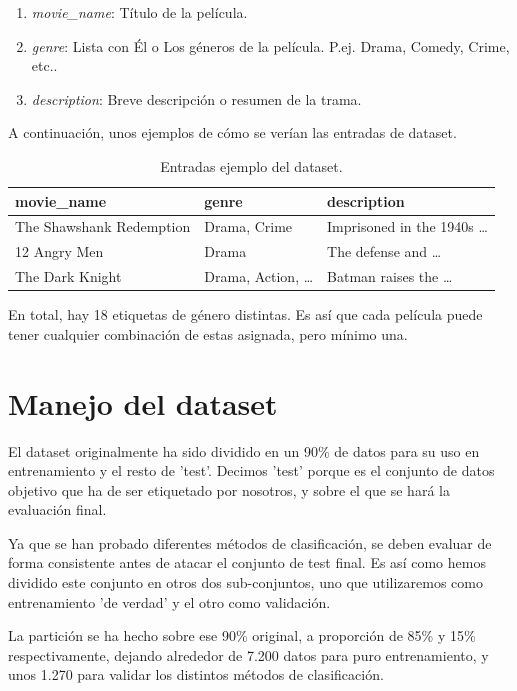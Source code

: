 \documentclass[11pt,spanish,listoffigures,listoftables]{tfgetsinf}
\begin{document}
\begin{enumerate}
    \item \textit{movie\_name}: Título de la película.
    \item \textit{genre}: Lista con Él o Los géneros de la película. P.ej. Drama, Comedy, Crime, etc..
    \item \textit{description}: Breve descripción o resumen de la trama.
\end{enumerate}

A continuación, unos ejemplos de cómo se verían las entradas de dataset.

\begin{table}[h]
    \centering
    \begin{tabular}{l|l|l}
    \textbf{movie\_name} & \textbf{genre} & \textbf{description} \\
    \hline
    The Shawshank Redemption & Drama, Crime & Imprisoned in the 1940s \ldots \\
    12 Angry Men & Drama & The defense and \ldots \\
    The Dark Knight & Drama, Action, \ldots & Batman raises the \ldots \\
    \end{tabular}
    \caption{Entradas ejemplo del dataset.}
\end{table}

En total, hay 18 etiquetas de género distintas. Es así que cada película puede tener cualquier combinación de estas asignada, pero mínimo una.

\section{Manejo del dataset}
El dataset originalmente ha sido dividido en un 90\% de datos para su uso en entrenamiento y el resto de 'test'. Decimos 'test' porque es el conjunto de datos objetivo que ha de ser etiquetado por nosotros, y sobre el que se hará la evaluación final.

Ya que se han probado diferentes métodos de clasificación, se deben evaluar de forma consistente antes de atacar el conjunto de test final. Es así como hemos dividido este conjunto en otros dos sub-conjuntos, uno que utilizaremos como entrenamiento 'de verdad' y el otro como validación. 

La partición se ha hecho sobre ese 90\% original, a proporción de 85\% y 15\% respectivamente, dejando alrededor de 7.200 datos para puro entrenamiento, y unos 1.270 para validar los distintos métodos de clasificación.   
\end{document}
